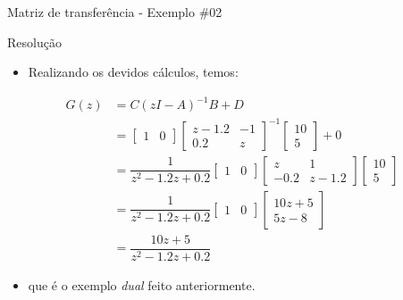 \begin{frame}{Matriz de transferência - Exemplo \#02}
\begin{block}{Resolução}
\begin{itemize}
    \item Realizando os devidos cálculos, temos:
\end{itemize}
\begin{align*}
    G(z) &= C(zI - A)^{-1} B + D \\
    &= \begin{bmatrix}
    1 & 0
    \end{bmatrix}
    \begin{bmatrix}
    z-\num{1,2} & -1 \\ \num{0,2} & z
    \end{bmatrix}^{-1} 
    \begin{bmatrix}
    10 \\ 5
    \end{bmatrix}
    + 0 \\
    &= \dfrac{1}{z^2-\num{1,2}z+\num{0,2}}
    \begin{bmatrix}
    1 & 0
    \end{bmatrix}
    \begin{bmatrix}
    z & 1 \\ -\num{0,2} & z-\num{1,2}
    \end{bmatrix}
    \begin{bmatrix}
    10 \\ 5
    \end{bmatrix} \\
    &= \dfrac{1}{z^2-\num{1,2}z+\num{0,2}}
    \begin{bmatrix}
    1 & 0
    \end{bmatrix}
    \begin{bmatrix}
    10z+5 \\ 5z-8
    \end{bmatrix} \\
    &= \dfrac{10z+5}{z^2-\num{1,2}z+\num{0,2}}
\end{align*}
\vspace{-0.3cm}
\begin{itemize}
    \item[] que é o exemplo \textit{dual} feito anteriormente.
\end{itemize}
\end{block}
\end{frame}

